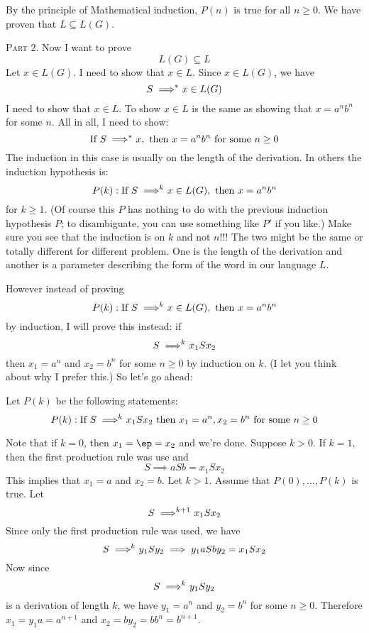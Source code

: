 By the principle of Mathematical induction, $P(n)$ is true for all 
$n \geq 0$.
We have proven that $L \subseteq L(G)$.


\textsc{Part 2.}
Now I want to prove 
\[
L(G) \subseteq L
\]
Let $x \in L(G)$.
I need to show that $x \in L$.
Since $x \in L(G)$, we have
\[
S \implies^{\hspace{-0.2cm}*}\ x \in L(G)
\]
I need to show that $x \in L$.
To show $x \in L$ is the same as showing that $x = a^n b^n$
for some $n$.
All in all, I need to show:
\[
\text{If } 
S \implies^{\hspace{-0.2cm}*} \ x,
\text{ then }
x = a^n b^n \text{ for some } n \geq 0
\]
The induction in this case is usually on the length of the
derivation.
In others the induction hypothesis is:
\[
P(k): 
\text{If } 
S \implies^{\hspace{-0.2cm} k}\ x \in L(G),
\text{ then }
x = a^n b^n
\]
for $k \geq 1$.
(Of course this $P$ has nothing to do with the previous
induction hypothesis $P$; to disambiguate, you can use something like $P'$
if you like.)
Make sure you see that the induction is on $k$ and not $n$!!!
The two might be the same or totally different for different problem.
One is the length of the derivation and another is a parameter describing
the form of the word in our language $L$.

However instead of proving 
\[
P(k): 
\text{If } 
S \implies^{\hspace{-0.2cm} k}\ x \in L(G),
\text{ then }
x = a^n b^n
\]
by induction, 
I will prove this instead:
if 
\[
S \implies^{\hspace{-0.2cm} k}\ x_1 S x_2 
\]
then $x_1 = a^n$ and $x_2 = b^n$ for some $n \geq 0$ by 
induction on $k$.
(I let you think about why I prefer this.)
So let's go ahead:

Let $P(k)$ be the following statements:
\[
P(k):
\text{If } 
S \implies^{\hspace{-0.2cm} k}\ x_1 S x_2 
\text{ then } x_1 = a^n, x_2 = b^n 
\text{ for some } n \geq 0 
\]

Note that if $k = 0$, then $x_1 = \ep = x_2$ and we're done.
Suppose $k > 0$.
If $k = 1$, then the first production rule was use and 
\[
S \implies aSb = x_1 S x_2
\]
This implies that $x_1 = a$ and $x_2 = b$.
Let $k > 1$.
Assume that $P(0), ..., P(k)$ is true.
Let
\[
S \implies^{\hspace{-0.2cm} k+1}\ x_1 S x_2 
\]
Since only the first production rule was used, we have
\[
S \implies^{\hspace{-0.2cm} k}\ y_1 S y_2 \implies y_1a S by_2 = x_1 S x_2 
\]
Now since 
\[
S \implies^{\hspace{-0.2cm} k}\ y_1 S y_2 
\]
is a derivation of length $k$, we have $y_1 = a^n$ and $y_2 = b^n$
for some $n \geq 0$.
Therefore $x_1 = y_1a = a^{n+1}$ and $x_2 = by_2 = bb^n = b^{n+1}$.
 
